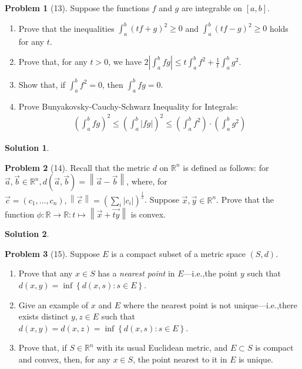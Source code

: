 \documentclass[12pt]{article}
\theoremstyle{definition} %
\newtheorem{solution}{Solution}
\newtheorem{problem}{Problem}
\theoremstyle{plain} %
\begin{document}
\begin{problem}[13]
   Suppose the functions $f$ and $g$ are integrable on $[a,b]$. 
   \begin{enumerate}
    \item Prove that the inequalities $\int_{a}^{b} (tf+g)^{2} \geq 0$ and $\int_{a}^{b} (tf-g)^{2} \geq 0$ holds for any $t$.
    \item Prove that, for any $t>0$, we have $2\left\vert \int_{a}^{b} fg \right\vert \leq t\int_{a}^{b} f^{2} +\frac{1}{t}\int_{a}^{b} g^{2}$.
    \item Show that, if $\int_{a}^{b} f^{2} = 0$, then $\int_{a}^{b} fg=0  $.     
    \item Prove Bunyakovsky-Cauchy-Schwarz Inequality for Integrals:
     \begin{align}
        \left( \int_{a}^{b} fg   \right)^{2} \leq \left( \int_{a}^{b} \left\vert fg \right\vert    \right)^{2} \leq \left( \int_{a}^{b} f^{2}   \right) \cdot \left( \int_{a}^{b} g^{2}  \right)
    \end{align}
   \end{enumerate}  
\end{problem}
\begin{solution}
    
\end{solution}
\begin{problem}[14]
   Recall that the metric $d$ on $\mathbb{{R}}^{n}$ is defined as follows: for $\vec{a}, \vec{b}\in \mathbb{{R}}^{n}, d(\vec{a},\vec{b})=\left\lVert \vec{a} -\vec{b} \right\rVert $, where, for $\vec{c}=(c_1, \ldots , c_{n}),\left\lVert \vec{c} \right\rVert =\left( \sum_{i} \left\vert c_i \right\vert  \right)^{\frac{1}{2}}  $. Suppose $\vec{x}, \vec{y} \in \mathbb{{R}}^{n}$. Prove that the function $\phi:\mathbb{{R}}\to \mathbb{{R}}:t \mapsto \left\lVert \vec{x} +\vec{ty} \right\rVert $ is convex.     
\end{problem}
\begin{solution}
    
\end{solution}
\begin{problem}[15]
   Suppose $E$ is a compact subset of a metric space $(S,d)$. 
   \begin{enumerate}
    \item Prove that any $x\in S$ has a \emph{nearest point} in $E$—i.e.,the point $y$ such that $d(x,y)=\inf \left\{ d(x,s):s\in E \right\} $.
    \item Give an example of $x$ and $E$ where the nearest point is not unique—i.e.,there exists distinct $y,z\in E$ such that $d(x,y)=d(x,z)=\inf \left\{ d(x,s) : s\in E \right\} $.
    \item Prove that, if $S\in \mathbb{{R}}^{n}$ with its usual Euclidean metric, and $E \subset S$ is compact and convex, then, for any $x\in S$, the point nearest to it in $E$ is unique.
   \end{enumerate} 
\end{problem}
\end{document}
